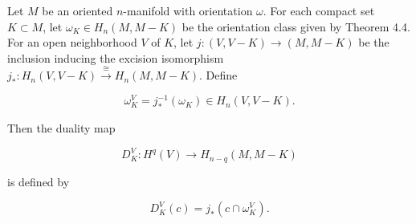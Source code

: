 Let $M$ be an oriented $n$-manifold with orientation $\omega$. For each compact set $K \subset M$, let $\omega_K \in H_n(M, M - K)$ be the orientation class given by Theorem 4.4. For an open neighborhood $V$ of $K$, let $j: (V, V - K) \to (M, M - K)$ be the inclusion inducing the excision isomorphism $j_*: H_n(V, V - K) \xrightarrow{\cong} H_n(M, M - K)$. Define

$$\omega_K^V = j_*^{-1}(\omega_K) \in H_n(V, V - K).$$

Then the duality map

$$D_K^V: H^q(V) \to H_{n-q}(M, M - K)$$

is defined by

$$D_K^V(c) = j_*(c \cap \omega_K^V).$$
